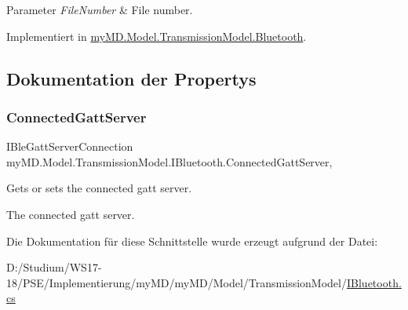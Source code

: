 \begin{DoxyParams}{Parameter}
{\em File\+Number} & File number.\\
\hline
\end{DoxyParams}


Implementiert in \mbox{\hyperlink{classmy_m_d_1_1_model_1_1_transmission_model_1_1_bluetooth_a37c0907154206af6e7d5498706be071f}{my\+M\+D.\+Model.\+Transmission\+Model.\+Bluetooth}}.



\subsection{Dokumentation der Propertys}
\mbox{\label{interfacemy_m_d_1_1_model_1_1_transmission_model_1_1_i_bluetooth_a803c3867d855403d8adb458753ab2315}} 
\subsubsection{\texorpdfstring{Connected\+Gatt\+Server}{ConnectedGattServer}}
{\footnotesize\ttfamily I\+Ble\+Gatt\+Server\+Connection my\+M\+D.\+Model.\+Transmission\+Model.\+I\+Bluetooth.\+Connected\+Gatt\+Server\hspace{0.3cm}{\ttfamily [get]}, {\ttfamily [set]}}



Gets or sets the connected gatt server. 

The connected gatt server.

Die Dokumentation für diese Schnittstelle wurde erzeugt aufgrund der Datei\+:\begin{DoxyCompactItemize}
\item 
D\+:/\+Studium/\+W\+S17-\/18/\+P\+S\+E/\+Implementierung/my\+M\+D/my\+M\+D/\+Model/\+Transmission\+Model/\mbox{\hyperlink{_i_bluetooth_8cs}{I\+Bluetooth.\+cs}}\end{DoxyCompactItemize}
